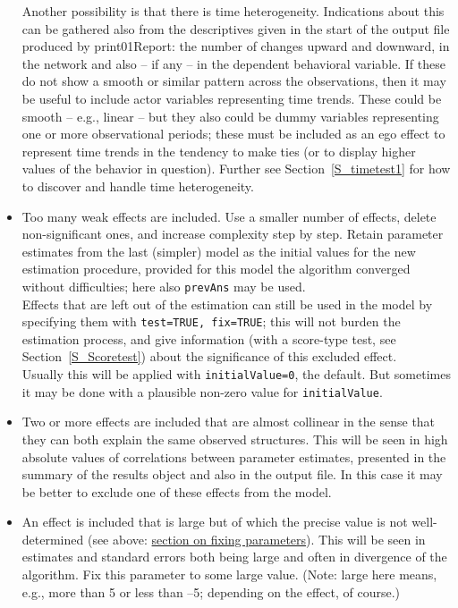 \documentclass[a4paper,fleqn,11pt]{article}
\newcommand{\+}{\, + \,}
\newcommand{\sfn}[1]{\textsf{#1}}
\begin{document}
\begin{itemize}
      Another possibility is that there is time heterogeneity.
      Indications about this can be gathered also from the descriptives
      given in the start of the output file produced by \sfn{print01Report}:
      the number of changes
      upward and downward, in the network and also -- if any -- in the
      dependent behavioral variable. If these do not show a smooth
      or similar pattern across the observations, then it may be useful
      to include actor variables representing time trends. These
      could be smooth -- e.g., linear -- but they also could be dummy variables
      representing one or more observational periods; these must be included
      as an ego effect to represent time trends in the tendency to make ties
      (or to display higher values of the behavior in question).
      Further see Section~\ref{S_timetest1} for how to discover and handle
      time heterogeneity.
\item Too many weak effects are included. Use a smaller number of effects,
      delete non-significant ones, and increase complexity step by step.
      Retain parameter estimates from the last
      (simpler) model as the initial values for the new estimation procedure,
      provided for this model the algorithm converged
      without difficulties; here also \texttt{prevAns} may be used.\\
      Effects that are left out of the estimation can still be
      used in the model by specifying them with \texttt{test=TRUE, fix=TRUE};
      this will not burden the estimation process, and give information
      (with a score-type test, see Section~\ref{S_Scoretest})
      about the significance of this excluded effect.\\
      Usually this will be applied with \texttt{initialValue=0}, the default.
      But sometimes it may be done with a plausible non-zero value for
      \texttt{initialValue}.
\item Two or more effects are included that are almost collinear
      in the sense that they can both explain the same observed structures.
      This will be seen in high absolute values of
      correlations between parameter estimates, presented in the
      \textsf{summary} of the results object and also in the output file.
      In this case it may be better to exclude one of these effects from the model.
\item An effect is included that is large but of which the precise
      value is not well-determined (see above:
      \hyperlink{T_fix}{section on fixing parameters}).
      This will be seen in estimates and standard errors both being large
      and often in divergence of the algorithm.
      Fix this parameter to some large value.
      (Note: large here means, e.g., more than 5 or less than --5; depending
      on the effect, of course.)
\end{itemize}
\end{document}

